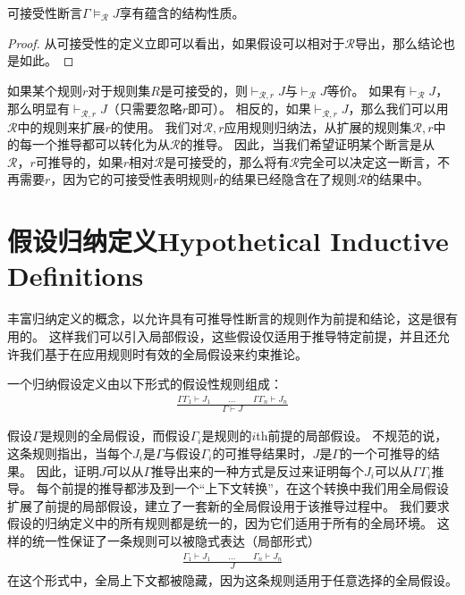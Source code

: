 \begin{theorem}[]
    可接受性断言$\Gamma \vDash_{\mathcal{R}} J$享有蕴含的结构性质。
\end{theorem}
\begin{proof}
    从可接受性的定义立即可以看出，如果假设可以相对于$ \mathcal{R} $导出，那么结论也是如此。
\end{proof}

如果某个规则$r$对于规则集$ R $是可接受的，则$ \vdash_{\mathcal{R},r} J $与$ \vdash_{\mathcal{R}} J $等价。
如果有$\vdash_{\mathcal{R}} J$，那么明显有$\vdash_{\mathcal{R},r} J$（只需要忽略$r$即可）。
相反的，如果$\vdash_{\mathcal{R},r} J$，那么我们可以用$\mathcal{R}$中的规则来扩展$r$的使用。
我们对$ \mathcal{R},r $应用规则归纳法，从扩展的规则集$ \mathcal{R},r $中的每一个推导都可以转化为从$ \mathcal{R} $的推导。
因此，当我们希望证明某个断言是从$ \mathcal{R}，r $可推导的，如果$ r $相对$ \mathcal{R} $是可接受的，那么将有$ \mathcal{R} $完全可以决定这一断言，不再需要$r$，因为它的可接受性表明规则$ r $的结果已经隐含在了规则$ \mathcal{R} $的结果中。

\section{假设归纳定义Hypothetical Inductive Definitions}
丰富归纳定义的概念，以允许具有可推导性断言的规则作为前提和结论，这是很有用的。
这样我们可以引入局部假设，这些假设仅适用于推导特定前提，并且还允许我们基于在应用规则时有效的全局假设来约束推论。

一个归纳假设定义由以下形式的假设性规则组成：
\begin{equation}
    \begin{aligned}
        \frac{\Gamma \Gamma_1 \vdash J_1 \qquad \dots \qquad \Gamma \Gamma_n \vdash J_n}{\Gamma \vdash J} \label{equation:three_nine}
    \end{aligned}
\end{equation}

假设$ \Gamma $是规则的全局假设，而假设$ \Gamma_i $是规则的$ i $th前提的局部假设。
不规范的说，这条规则指出，当每个$ J_i $是$ \Gamma $与假设$ \Gamma_i $的可推导结果时，$ J $是$ \Gamma $的一个可推导的结果。
因此，证明$ J $可以从$ \Gamma $推导出来的一种方式是反过来证明每个$ J_i $可以从$ \Gamma \Gamma_i $推导。
每个前提的推导都涉及到一个“上下文转换”，在这个转换中我们用全局假设扩展了前提的局部假设，建立了一套新的全局假设用于该推导过程中。
我们要求假设的归纳定义中的所有规则都是统一的，因为它们适用于所有的全局环境。
这样的统一性保证了一条规则可以被隐式表达（局部形式）
\begin{equation}
    \begin{aligned}
        \frac{\Gamma_1 \vdash J_1 \qquad \dots \qquad \Gamma_n \vdash J_n}{J}
    \end{aligned}
\end{equation}
在这个形式中，全局上下文都被隐藏，因为这条规则适用于任意选择的全局假设。

